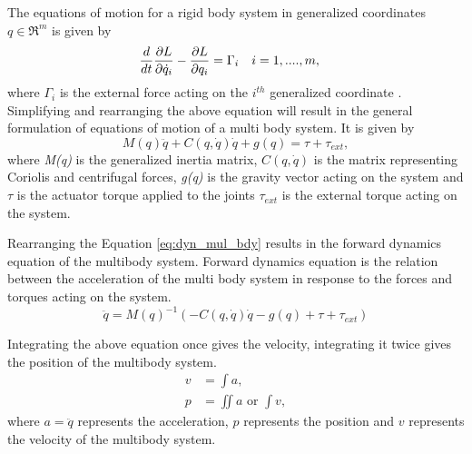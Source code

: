 The equations of motion for a rigid body system in generalized coordinates $q \in \Re^m $ is given by
\begin{align}
\label{eq:lagrange}
\frac{d}{dt} &\frac{\partial {L}}{\partial {\dot{q}_i}} - \frac{\partial {L}}{\partial {q_i}} = \Gamma_i && i=1,....,m,
\end{align}
where $\Gamma_i$ is the external force acting on the $i^{th}$ generalized coordinate \cite[Chapter 4]{mur94}.
Simplifying and rearranging the above equation will result in the general formulation of equations of motion of a multi body system. It is given by
\begin{equation}
\label{eq:dyn_mul_bdy}
M(q)\ddot{q}+C(q,\dot{q})\dot{q}+g(q) = \tau + \tau_{ext},
\end{equation}
where \emph{M(q)} is the generalized inertia matrix, $C(q,\dot{q})$ is the matrix representing Coriolis and centrifugal forces, \emph{g(q)} is the gravity vector acting on the system and $\tau$ is the actuator torque applied to the joints $\tau_{ext}$ is the external torque acting on the system.

Rearranging the Equation \ref{eq:dyn_mul_bdy} results in the forward dynamics equation of the multibody system. Forward dynamics equation is the relation between the acceleration of the multi body system in response to the forces and torques acting on the system.
\begin{equation}
    \label{eq:fwdyn}
    \ddot{q} = M(q)^{-1} (- C(q,\dot{q})\dot{q} -g(q) + \tau + \tau_{ext})
\end{equation}

Integrating the above equation once gives the velocity, integrating it twice gives the position of the multibody system. 
$$ \begin{aligned} 
    v &= \int a ,\\ 
    p &=  \iint a \text{ or } \int v , 
    \end{aligned}$$ where $a = \ddot{q}$ represents the acceleration, $p$ represents the position and $v$ represents the velocity of the multibody system.

